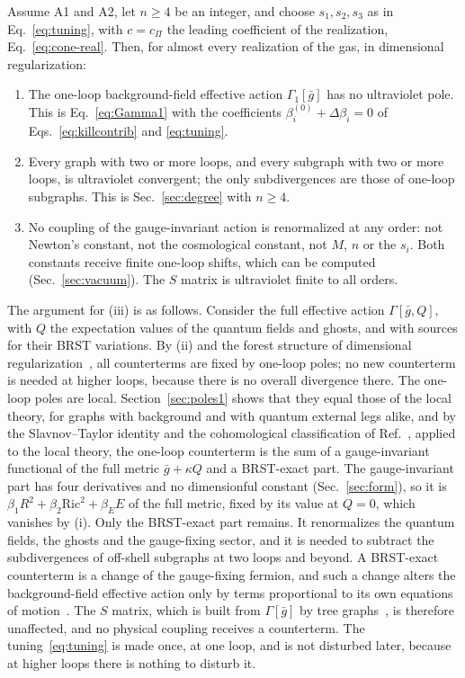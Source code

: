 \documentclass[aps,prd,10pt,twocolumn,superscriptaddress,nofootinbib,floatfix,longbibliography]{revtex4-2}
\newcommand{\Ric}{\mathrm{Ric}}
\begin{document}
Assume A1 and A2, let $n\ge4$ be an integer, and choose $s_1,s_2,s_3$ as in Eq.~\eqref{eq:tuning}, with $c=c_\Pi$ the leading coefficient of the realization, Eq.~\eqref{eq:cone-real}. Then, for almost every realization of the gas, in dimensional regularization:
\begin{enumerate}[label=\textup{(\roman*)},leftmargin=2.2em,itemsep=0.2em]
\item The one-loop background-field effective action $\Gamma_1[\bar g]$ has no ultraviolet pole. This is Eq.~\eqref{eq:Gamma1} with the coefficients $\beta_i^{(0)}+\Delta\beta_i=0$ of Eqs.~\eqref{eq:killcontrib} and \eqref{eq:tuning}.
\item Every graph with two or more loops, and every subgraph with two or more loops, is ultraviolet convergent; the only subdivergences are those of one-loop subgraphs. This is Sec.~\ref{sec:degree} with $n\ge4$.
\item No coupling of the gauge-invariant action is renormalized at any order: not Newton's constant, not the cosmological constant, not $M$, $n$ or the $s_i$. Both constants receive finite one-loop shifts, which can be computed (Sec.~\ref{sec:vacuum}). The $S$ matrix is ultraviolet finite to all orders.
\end{enumerate}
The argument for (iii) is as follows. Consider the full effective action $\Gamma[\bar g,Q]$, with $Q$ the expectation values of the quantum fields and ghosts, and with sources for their BRST variations. By (ii) and the forest structure of dimensional regularization~\cite{Collins1984}, all counterterms are fixed by one-loop poles; no new counterterm is needed at higher loops, because there is no overall divergence there. The one-loop poles are local. Section~\ref{sec:poles1} shows that they equal those of the local theory, for graphs with background and with quantum external legs alike, and by the Slavnov--Taylor identity and the cohomological classification of Ref.~\cite{BarnichBrandtHenneaux2000}, applied to the local theory, the one-loop counterterm is the sum of a gauge-invariant functional of the full metric $\bar g+\kappa Q$ and a BRST-exact part. The gauge-invariant part has four derivatives and no dimensionful constant (Sec.~\ref{sec:form}), so it is $\beta_1R^2+\beta_2\Ric^2+\beta_EE$ of the full metric, fixed by its value at $Q=0$, which vanishes by (i). Only the BRST-exact part remains. It renormalizes the quantum fields, the ghosts and the gauge-fixing sector, and it is needed to subtract the subdivergences of off-shell subgraphs at two loops and beyond. A BRST-exact counterterm is a change of the gauge-fixing fermion, and such a change alters the background-field effective action only by terms proportional to its own equations of motion~\cite{KalloshTarasovTyutin1978,BarnichBrandtHenneaux2000}. The $S$ matrix, which is built from $\Gamma[\bar g]$ by tree graphs~\cite{AbbottGrisaruSchaefer1983}, is therefore unaffected, and no physical coupling receives a counterterm. The tuning~\eqref{eq:tuning} is made once, at one loop, and is not disturbed later, because at higher loops there is nothing to disturb it.
\end{document}
